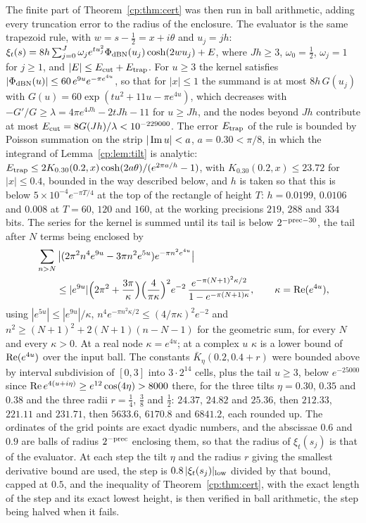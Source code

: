 The finite part of Theorem~\ref{cp:thm:cert} was then run in ball arithmetic, adding every truncation error to the radius of the enclosure. The evaluator is the same trapezoid rule, with $w=s-\frac12=x+i\theta$ and $u_j=jh$: $\xi_t(s)=8h\sum_{j=0}^{J}\omega_je^{tu_j^2}\Phi_{\rm dBN}(u_j)\cosh(2wu_j)+E$, where $Jh\ge3$, $\omega_0=\frac12$, $\omega_j=1$ for $j\ge1$, and $|E|\le E_{\rm cut}+E_{\rm trap}$. For $u\ge3$ the kernel satisfies $|\Phi_{\rm dBN}(u)|\le60\,e^{9u}e^{-\pi e^{4u}}$, so that for $|x|\le1$ the summand is at most $8h\,G(u_j)$ with $G(u)=60\exp(tu^2+11u-\pi e^{4u})$, which decreases with $-G'/G\ge\lambda=4\pi e^{4Jh}-2tJh-11$ for $u\ge Jh$, and the nodes beyond $Jh$ contribute at most $E_{\rm cut}=8G(Jh)/\lambda<10^{-229000}$. The error $E_{\rm trap}$ of the rule is bounded by Poisson summation on the strip $|\operatorname{Im} u|<a$, $a=0.30<\pi/8$, in which the integrand of Lemma~\ref{cp:lem:tilt} is analytic: $E_{\rm trap}\le2K_{0.30}(0.2,x)\cosh(2a\theta)/(e^{2\pi a/h}-1)$, with $K_{0.30}(0.2,x)\le23.72$ for $|x|\le0.4$, bounded in the way described below, and $h$ is taken so that this is below $5\times10^{-4}e^{-\pi T/4}$ at the top of the rectangle of height $T$: $h=0.0199$, $0.0106$ and $0.008$ at $T=60$, $120$ and $160$, at the working precisions $219$, $288$ and $334$ bits. The series for the kernel is summed until its tail is below $2^{-{\rm prec}-30}$, the tail after $N$ terms being enclosed by
\[\begin{aligned}
&\sum_{n>N}\big|(2\pi^2n^4e^{9u}-3\pi n^2e^{5u})e^{-\pi n^2e^{4u}}\big|\\&\qquad\le|e^{9u}|\Big(2\pi^2+\frac{3\pi}\kappa\Big)\Big(\frac4{\pi\kappa}\Big)^2e^{-2}\,\frac{e^{-\pi(N+1)^2\kappa/2}}{1-e^{-\pi(N+1)\kappa}},\qquad \kappa=\operatorname{Re}(e^{4u}),
\end{aligned}\]
using $|e^{5u}|\le|e^{9u}|/\kappa$, $n^4e^{-\pi n^2\kappa/2}\le(4/\pi\kappa)^2e^{-2}$ and $n^2\ge(N+1)^2+2(N+1)(n-N-1)$ for the geometric sum, for every $N$ and every $\kappa>0$. At a real node $\kappa=e^{4u}$; at a complex $u$ $\kappa$ is a lower bound of $\operatorname{Re}(e^{4u})$ over the input ball. The constants $\bar K_\eta(0.2,0.4+r)$ were bounded above by interval subdivision of $[0,3]$ into $3\cdot2^{14}$ cells, plus the tail $u\ge3$, below $e^{-25000}$ since $\operatorname{Re} e^{4(u+i\eta)}\ge e^{12}\cos(4\eta)>8000$ there, for the three tilts $\eta=0.30$, $0.35$ and $0.38$ and the three radii $r=\frac14$, $\frac38$ and $\frac12$: $24.37$, $24.82$ and $25.36$, then $212.33$, $221.11$ and $231.71$, then $5633.6$, $6170.8$ and $6841.2$, each rounded up. The ordinates of the grid points are exact dyadic numbers, and the abscissae $0.6$ and $0.9$ are balls of radius $2^{-{\rm prec}}$ enclosing them, so that the radius of $\xi_t(s_j)$ is that of the evaluator. At each step the tilt $\eta$ and the radius $r$ giving the smallest derivative bound are used, the step is $0.8\,|\xi_t(s_j)|_{\rm low}$ divided by that bound, capped at $0.5$, and the inequality of Theorem~\ref{cp:thm:cert}, with the exact length of the step and its exact lowest height, is then verified in ball arithmetic, the step being halved when it fails.

